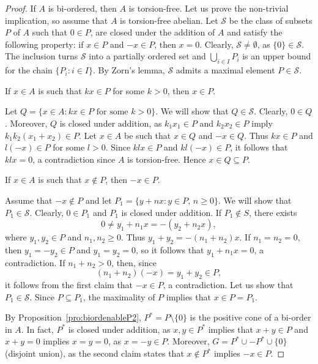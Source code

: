\begin{proof}
	If $A$ is bi-ordered, then $A$ is torsion-free. Let us prove the non-trivial implication, 
	so assume that
	$A$ is torsion-free abelian. Let $\mathcal{S}$ be the class 
	of subsets $P$ of $A$ such that $0\in P$, are closed under 
	the addition of
	$A$ and satisfy the following property: if $x\in P$ and $-x\in P$,
	then $x=0$.
	Clearly, $\mathcal{S}\ne\emptyset$, as 
	$\{0\}\in\mathcal{S}$.  The inclusion turns $\mathcal{S}$ into a partially ordered set  
	and $\bigcup_{i\in I}P_i$ is an upper bound for the chain 
	$\{P_i:i\in I\}$. By Zorn's lemma, 
	$\mathcal{S}$ admits a maximal element $P\in\mathcal{S}$.

	\begin{claim}
		If $x\in A$ is such that $kx\in P$ for some $k>0$, then  $x\in P$.		
	\end{claim}

	Let $Q=\{x\in A:kx\in P\text{ for some 
	$k>0$}\}$. We will show that $Q\in\mathcal{S}$.  Clearly, $0\in Q$. Moreover, $Q$
	is closed under addition, as $k_1x_1\in P$ and $k_2x_2\in P$ imply 
	$k_1k_2(x_1+x_2)\in P$. Let $x\in A$ be such that $x\in Q$ and $-x\in Q$. Thus 
	$kx\in P$ and $l(-x)\in P$ for some $l>0$. Since $klx\in P$ and 
	$kl(-x)\in P$, it follows that $klx=0$, a contradiction since $A$ is torsion-free. 
	Hence $x\in Q\subseteq P$. 

	\begin{claim}
		If $x\in A$ is such that $x\not\in P$, then $-x\in P$. 	
	\end{claim}

	Assume that $-x\not\in P$ and let $P_1=\{y+nx:y\in P,\,n\geq0\}$. We will
	show that  $P_1\in\mathcal{S}$.  Clearly, $0\in P_1$ and $P_1$ is closed under
	addition. If $P_1\not\in S$, there exists 
	\[
		0\ne y_1+n_1x=-(y_2+n_2x),
	\]
	where $y_1,y_2\in P$ and $n_1,n_2\geq0$. Thus $y_1+y_2=-(n_1+n_2)x$. If 
	$n_1=n_2=0$, then $y_1=-y_2\in P$ and $y_1=y_2=0$, so it follows that
	$y_1+n_1x=0$, a contradiction. If $n_1+n_2>0$, then, since 
	\[
		(n_1+n_2)(-x)=y_1+y_2\in P,
	\]
	it follows from the first claim that $-x\in P$, a contradiction. 
	Let us show that $P_1\in\mathcal{S}$. 
	Since $P\subseteq P_1$, the maximality of $P$ implies that 
	$x\in P=P_1$.

	\medskip
	By Proposition~\ref{pro:biordenableP2}, 
	$P^*=P\setminus\{0\}$ is the positive cone of a bi-order in $A$. 
	In fact, $P^*$ is closed under addition, as $x,y\in
	P^*$ implies that $x+y\in P$ and $x+y=0$ implies $x=y=0$, as $x=-y\in P$. Moreover,
	$G=P^*\cup -P^*\cup\{0\}$ (disjoint union), as 
	the second claim states that $x\not\in P^*$ implies 
	$-x\in P$. 
\end{proof}

